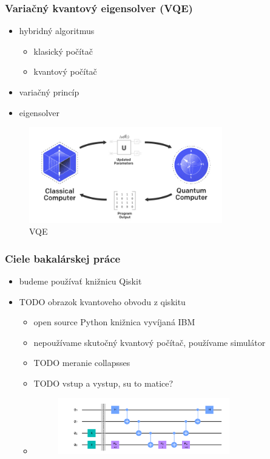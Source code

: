 \documentclass{beamer}
\begin{document}
\begin{frame}
	\frametitle{Variačný kvantový eigensolver (VQE)}
	\begin{itemize}
		\item hybridný algoritmus
		      \begin {itemize}
		\item klasický počítač
		\item kvantový počítač 
	\end{itemize}
	\item variačný princíp
	\item eigensolver
	\end{itemize}
		
	\begin{figure}
		\centering
		\includegraphics[width=0.75\textwidth]{vqe.jpeg}
		\caption{VQE}
				            
	\end{figure}
\end{frame}


\begin{frame}
	\frametitle{Ciele bakalárskej práce}
	\begin{itemize}
		\item budeme používať knižnicu Qiskit
		\item TODO obrazok kvantoveho obvodu z qiskitu
		      \begin{itemize}
		      	\item open source Python knižnica vyvíjaná IBM
		      	\item nepoužívame skutočný kvantový počítač, používame simulátor
		      	\item TODO meranie collapsses
		      	\item TODO vstup a vystup, su to matice?
		      	\item \begin{figure}
		      	      \centering
		      	      \includegraphics[width=0.75\textwidth]{quantum_circuit.png}
		      	\end{figure}
		      \end{itemize}
		      		            
	\end{itemize}
\end{frame}
\end{document}
